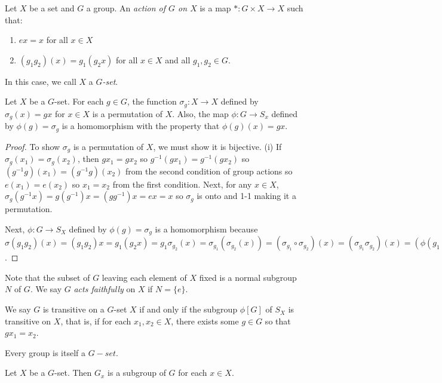 \begin{definition}
    Let $X$ be a set and $G$ a group. An \emph{action of $G$ on $X$} is a map $*\colon G\times X\to X$ such that: \begin{enumerate}
        \item $ex = x$ for all $x \in X$
        \item $(g_1g_2)(x) = g_1(g_2x)$ for all $x \in X$ and all $g_1, g_2 \in G$.
    \end{enumerate}
    In this case, we call $X$ a \emph{$G$-set}.
\end{definition}
\begin{theorem}
    Let $X$ be a $G$-set. For each $g\in G$, the function $\sigma_g\colon X\to X$ defined by $\sigma_g(x)=gx$ for $x \in X$ is a permutation of $X$. Also, the map $\phi\colon G\to S_x$ defined by $\phi(g) = \sigma_g$ is a homomorphism with the property that $\phi(g)(x)=gx$.
\end{theorem}
\begin{proof}
    To show $\sigma_g$ is a permutation of $X$, we must show it is bijective. (i) If $\sigma_g(x_1) = \sigma_g(x_2)$, then $gx_1=gx_2$ so $g^{-1}(gx_1)=g^{-1}(gx_2)$ so $(g^{-1}g)(x_1)=(g^{-1}g)(x_2)$ from the second condition of group actions so $e(x_1)=e(x_2)$ so $x_1=x_2$ from the first condition. Next, for any $x \in X$, $\sigma_g(g^{-1}x)=g(g^{-1})x=(gg^{-1})x=ex=x$ so $\sigma_g$ is onto and 1-1 making it a permutation.

    Next, $\phi\colon G\to S_X$ defined by $\phi(g) = \sigma_g$ is a homomorphism because $\sigma(g_1g_2)(x) = (g_1g_2)x=g_1(g_2x)=g_1\sigma_{g_2}(x)=\sigma_{g_1}(\sigma_{g_2}(x))=(\sigma_{g_1}\circ\sigma_{g_2})(x) = (\sigma_{g_1}\sigma_{g_2})(x)=(\phi(g_1)\phi(g_2))(x)$.
\end{proof}
\begin{definition}
    Note that the subset of $G$ leaving each element of $X$ fixed is a normal subgroup $N$ of $G$. We say $G$ \emph{acts faithfully} on $X$ if $N = \{e\}$.

    We say $G$ is transitive on a $G$-set $X$ if and only if the subgroup $\phi[G]$ of $S_X$ is transitive on $X$, that is, if for each $x_1, x_2 \in X$, there exists some $g \in G$ so that $gx_1 = x_2$.
\end{definition}
\begin{remark}
    Every group is itself a $G-set$.
\end{remark}
\begin{theorem}
    Let $X$ be a $G$-set. Then $G_x$ is a subgroup of $G$ for each $x \in X$.
\end{theorem}
